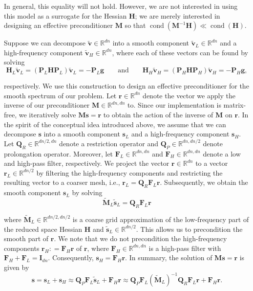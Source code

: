 \documentclass[11pt]{amsart}
\newcommand\di[1]{\ensuremath{\mathbf{#1}}}
\newcommand{\defeq}{\ensuremath{\mathrel{\mathop:}=}}
\begin{document}
\noindent In general, this equality will not hold. However, we are not interested in using this model as a surrogate for the Hessian $\di{H}$; we are merely interested in designing an effective preconditioner $\di{M}$ so that $\operatorname{cond}(\di{M}^{-1} \di{H}) \ll \operatorname{cond}(\di{H})$.

Suppose we can decompose $\di{\tilde{v}} \in \mathbb{R}^{dn}$ into a smooth component $\di{\tilde{v}}_L \in \mathbb{R}^{dn}$ and a high-frequency component $\di{\tilde{v}}_H \in \mathbb{R}^{dn}$, where each of these vectors can be found by solving
\[
\di{H}_L\di{\tilde{v}}_L = (\di{P}_L\di{H}\di{P}_L)\di{\tilde{v}}_L = -\di{P}_L\di{g}
\qquad\text{and}\qquad
\di{H}_H\di{\tilde{v}}_H = (\di{P}_H\di{H}\di{P}_H)\di{\tilde{v}}_H = -\di{P}_H\di{g},
\]

\noindent respectively. We use this construction to design an effective preconditioner for the smooth spectrum of our problem. Let $\di{r}\in\mathbb{R}^{dn}$ denote the vector we apply the inverse of our preconditioner $\di{M} \in \mathbb{R}^{dn,dn}$ to. Since our implementation is matrix-free, we iteratively solve $\di{M} \di{s} = \di{r}$ to obtain the action of the inverse of $\di{M}$ on $\di{r}$. In the spirit of the conceptual idea introduced above, we assume that we can decompose $\di{s}$ into a smooth component $\di{s}_L$ and a high-frequency component $\di{s}_H$. Let $\di{Q}_R \in \mathbb{R}^{dn/2,dn}$ denote a restriction operator and $\di{Q}_P \in \mathbb{R}^{dn,dn/2}$ denote prolongation operator. Moreover, let $\di{F}_L \in \mathbb{R}^{dn,dn}$ and  $\di{F}_H \in \mathbb{R}^{dn,dn}$ denote a low and high-pass filter, respectively. We project the vector $\di{r} \in \mathbb{R}^{dn}$ to a vector $\di{r}_L \in \mathbb{R}^{dn/2}$ by filtering the high-frequency components and restricting the resulting vector to a coarser mesh, i.e., $\di{r}_L =  \di{Q}_R \di{F}_L \di{r}$. Subsequently, we obtain the smooth component $\di{s}_L$ by solving
\[
\di{\tilde{M}}_L \di{\tilde{s}}_L = \di{Q}_R \di{F}_L \di{r}
\]

\noindent where $\di{\tilde{M}}_L \in \mathbb{R}^{dn/2,dn/2}$ is a coarse grid approximation of the low-frequency part of the reduced space Hessian $\di{H}$ and $\di{\tilde{s}}_L \in \mathbb{R}^{dn/2}$. This allows us to precondition the smooth part of $\di{r}$. We note that we do not precondition the high-frequency components $\di{r}_H \defeq \di{F}_H \di{r}$ of $\di{r}$, where $\di{F}_H \in \mathbb{R}^{dn,dn}$ is a high-pass filter with $\di{F}_H + \di{F}_L = \di{I}_{dn}$. Consequently, $\di{s}_H = \di{F}_H \di{r}$. In summary, the solution of $\di{M} \di{s} = \di{r}$ is given by
\[
\di{s} =
\di{s}_L + \di{s}_H
\approx
\di{Q}_P \di{F}_L \di{\tilde{s}}_L + \di{F}_H \di{r}
\approx
\di{Q}_P \di{F}_L (\di{\tilde{M}}_L)^{-1}\di{Q}_R \di{F}_L \di{r} + \di{F}_H \di{r}.
\]
\end{document}
